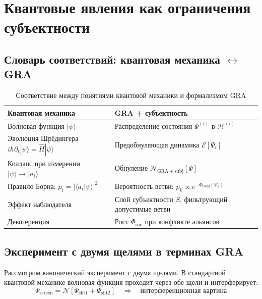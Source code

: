 \documentclass[11pt,a4paper]{article}
\theoremstyle{plain}
\theoremstyle{definition}
\theoremstyle{remark}
\newcommand{\PsiState}{\Psi}
\newcommand{\Foam}{\Phi}
\newcommand{\NullOp}{\mathcal{N}}
\newcommand{\Hilbert}{\mathcal{H}}
\newcommand{\Ssubj}{S}
\newcommand{\Fsoc}{\Foam_{\mathrm{soc}}}
\begin{document}
\section{Квантовые явления как ограничения субъектности}
\label{sec:quantum}

\subsection{Словарь соответствий: квантовая механика $\leftrightarrow$ GRA}

\begin{table}[H]
\centering
\caption{Соответствие между понятиями квантовой механики и формализмом GRA}
\label{tab:quantum-dictionary}
\begin{tabularx}{\linewidth}{@{}lX@{}}
\toprule
\textbf{Квантовая механика} & \textbf{GRA + субъектность} \\
\midrule
Волновая функция $|\psi\rangle$ & Распределение состояния $\PsiState^{(l)}$ в $\Hilbert^{(l)}$ \\
Эволюция Шрёдингера $i\hbar\partial_t|\psi\rangle = \hat{H}|\psi\rangle$ & Предобнуляющая динамика $\mathcal{E}[\PsiState_t]$ \\
Коллапс при измерении $|\psi\rangle \to |a_i\rangle$ & Обнуление $\NullOp_{\mathrm{GRA+subj}}[\PsiState]$ \\
Правило Борна: $p_i = |\langle a_i|\psi\rangle|^2$ & Вероятность ветви: $p_k \propto e^{-\Foam_{\mathrm{total}}(\PsiState_k)}$ \\
Эффект наблюдателя & Слой субъектности $\Ssubj$, фильтрующий допустимые ветви \\
Декогеренция & Рост $\Fsoc$ при конфликте альянсов \\
\bottomrule
\end{tabularx}
\end{table}

\subsection{Эксперимент с двумя щелями в терминах GRA}

Рассмотрим канонический эксперимент с двумя щелями. В стандартной квантовой механике волновая функция проходит через обе щели и интерферирует:
\begin{equation}
    \Psi_{\mathrm{screen}} = \mathcal{N}\!\left[ \Psi_{\mathrm{slit1}} + \Psi_{\mathrm{slit2}} \right] 
    \quad \Rightarrow \quad \text{интерференционная картина}
\end{equation}
\end{document}
